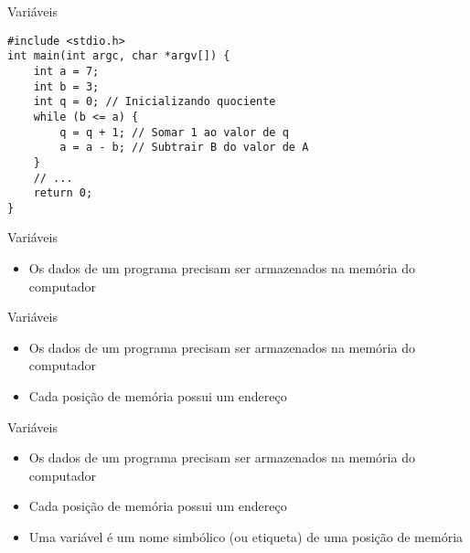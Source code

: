 \documentclass[t, aspectratio=169]{beamer}
\begin{document}
\begin{frame}[label={sec:org7b86131},fragile]{Variáveis}
 \vspace{-0.5cm}
\begin{verbatim}
#include <stdio.h>
int main(int argc, char *argv[]) {
    int a = 7;
    int b = 3;
    int q = 0; // Inicializando quociente
    while (b <= a) {
        q = q + 1; // Somar 1 ao valor de q
        a = a - b; // Subtrair B do valor de A
    }
    // ...
    return 0;
}
\end{verbatim}
\end{frame}

\begin{frame}[label={sec:org935438f}]{Variáveis}
\begin{itemize}
\item Os dados de um programa precisam ser armazenados na \alert{memória} do computador
\end{itemize}
\end{frame}

\begin{frame}[label={sec:org1e85bb2}]{Variáveis}
\begin{itemize}
\item Os dados de um programa precisam ser armazenados na \alert{memória} do computador
\item Cada posição de memória possui um \alert{endereço}
\end{itemize}
\end{frame}

\begin{frame}[label={sec:orgf805ce5}]{Variáveis}
\begin{itemize}
\item Os dados de um programa precisam ser armazenados na \alert{memória} do computador
\item Cada posição de memória possui um \alert{endereço}
\item Uma variável é um \alert{nome simbólico} (ou etiqueta) de uma posição de memória
\end{itemize}
\end{frame}
\end{document}
